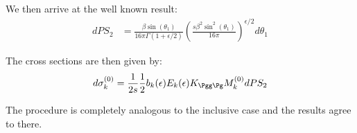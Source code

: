 We then arrive at the well known result\cite{Harris:1995tu}:
\begin{align}
dPS_2 &= \frac{\beta \sin(\theta_1)}{16\pi\Gamma(1+\epsilon/2)}\left(\frac{s\beta^2\sin^2(\theta_1)}{16\pi}\right)^{\epsilon/2}d\theta_1
\end{align}

The cross sections are then given by:
\begin{align}
d\sigma_k^{(0)} = \frac{1}{2s}\frac 1 2 b_k(\epsilon) E_k(\epsilon) K_{\Pgg\Pg} M_k^{(0)} dPS_2
\end{align}

The procedure is completely analogous to the inclusive case  and the results agree to there.
